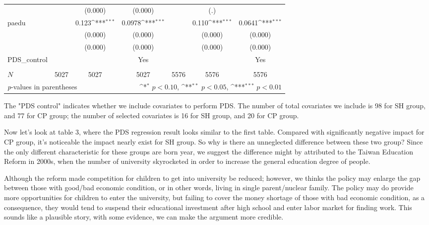 \documentclass[]{AEA}
\def\sym#1{\ifmmode^{#1}\else\(^{#1}\)\fi}
\begin{document}
\begin{center}
\begin{table}
\begin{tabular}{l*{6}c}
                &                     &     (0.000)         &     (0.000)         &                     &         (.)         &                     \\
    [1em]
    paedu       &                     &       0.123\sym{***}&      0.0978\sym{***}&                     &       0.110\sym{***}&      0.0641\sym{***}\\
            &                     &     (0.000)         &     (0.000)         &                     &     (0.000)         &     (0.000)         \\
            &                     &     (0.000)         &     (0.000)         &                     &     (0.000)         &     (0.000)         \\
    [1em]
    PDS\_control  &   &  &  Yes    &  &    &  Yes \\
    &   &      &      &   &      &      \\
    \hline
    \(N\)       &        5027         &        5027         &        5027         &        5576         &        5576         &        5576         \\
    \bottomrule
    \multicolumn{3}{l}{\footnotesize \textit{p}-values in parentheses} & \multicolumn{4}{r}{\footnotesize \sym{*} \(p<0.10\), \sym{**} \(p<0.05\), \sym{***} \(p<0.01\)}\\
    \end{tabular}
    \begin{tablenotes}
        The "PDS control" indicates whether we include covariates to perform PDS.  The number of total covariates we include is 98 for SH group, and 77 for CP group; the number of selected covariates is 16 for SH group, and 20 for CP group.
    \end{tablenotes}
    \end{table}
    \end{center}

    Now let's look at table 3, where the PDS regression result looks similar to the first table.  Compared with significantly negative impact for CP group, it's noticeable the impact nearly exist for SH group.  So why is there an unneglected difference between these two group?  Since the only different characteristic for these groups are born year, we suggest the difference might by attributed to the Taiwan Education Reform in 2000s, when the number of university skyrocketed in order to increase the general education degree of people.  
    
    Although the reform made competition for children to get into university be reduced; however, we thinks the policy may enlarge the gap between those with good/bad economic condition, or in other words, living in single parent/nuclear family.  The policy may do provide more opportunities for children to enter the university, but failing to cover the money shortage of those with bad economic condition, as a consequence, they would tend to suspend their educational investment after high school and enter labor market for finding work.  This sounds like a plausible story, with some evidence, we can make the argument more credible.
\end{document}

